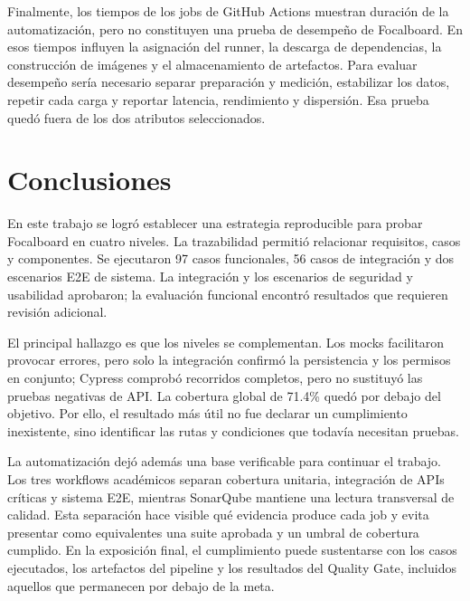 \documentclass[conference]{IEEEtran}
\begin{document}
Finalmente, los tiempos de los jobs de GitHub Actions muestran duración de la automatización, pero no constituyen una prueba de desempeño de Focalboard. En esos tiempos influyen la asignación del runner, la descarga de dependencias, la construcción de imágenes y el almacenamiento de artefactos. Para evaluar desempeño sería necesario separar preparación y medición, estabilizar los datos, repetir cada carga y reportar latencia, rendimiento y dispersión. Esa prueba quedó fuera de los dos atributos seleccionados.
\vspace{\baselineskip}

\section{Conclusiones}
En este trabajo se logró establecer una estrategia reproducible para probar Focalboard en cuatro niveles. La trazabilidad permitió relacionar requisitos, casos y componentes. Se ejecutaron 97 casos funcionales, 56 casos de integración y dos escenarios E2E de sistema. La integración y los escenarios de seguridad y usabilidad aprobaron; la evaluación funcional encontró resultados que requieren revisión adicional.

El principal hallazgo es que los niveles se complementan. Los mocks facilitaron provocar errores, pero solo la integración confirmó la persistencia y los permisos en conjunto; Cypress comprobó recorridos completos, pero no sustituyó las pruebas negativas de API. La cobertura global de 71.4\% quedó por debajo del objetivo. Por ello, el resultado más útil no fue declarar un cumplimiento inexistente, sino identificar las rutas y condiciones que todavía necesitan pruebas.

La automatización dejó además una base verificable para continuar el trabajo. Los tres workflows académicos separan cobertura unitaria, integración de APIs críticas y sistema E2E, mientras SonarQube mantiene una lectura transversal de calidad. Esta separación hace visible qué evidencia produce cada job y evita presentar como equivalentes una suite aprobada y un umbral de cobertura cumplido. En la exposición final, el cumplimiento puede sustentarse con los casos ejecutados, los artefactos del pipeline y los resultados del Quality Gate, incluidos aquellos que permanecen por debajo de la meta.
\vspace{\baselineskip}
\end{document}
